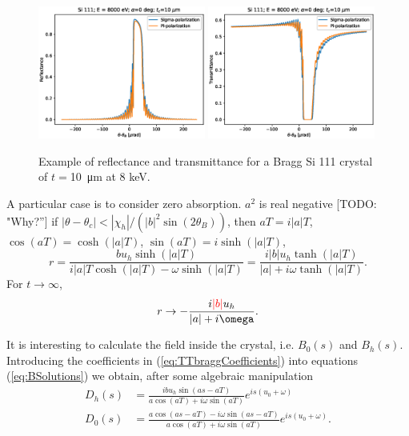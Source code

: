 \documentclass[preprint]{iucr}              %
\newcommand{\todo}[1]{{\color{red}[TODO: "#1'']}}
\newcommand{\inblue}[1]{{\color{blue}#1}}
\newcommand{\inred}[1]{{\color{red}#1}}
\begin{document}
\begin{figure}\label{fig:braggProfiles}
    \centering
    \includegraphics[width=0.49\textwidth]{figures/Bragg_1.eps}
    \includegraphics[width=0.49\textwidth]{figures/Bragg_2.eps}
    \caption{Example of reflectance and transmittance for a Bragg Si 111 crystal of $t=$\SI{10}{\micro\meter} at 8 keV. }
\end{figure}


\inblue{A particular case is to consider zero absorption. 
$a^2$ is real negative \todo{Why?} if $|\theta-\theta_c|<|\chi_h|/(|b|^2 \sin(2 \theta_B))$, then $aT=i |a| T$, $\cos(a T)=\cosh(|a|T)$, $\sin(a T)=i \sinh(|a|T)$, 
\begin{equation}
    r = \frac{b u_h \sinh(|a|T)}{i |a|T \cosh(|a|T)- \omega
    \sinh(|a|T)}=
\frac{i |b| u_h \tanh(|a|T)}{|a|+ i \omega \tanh(|a|T)}.
\end{equation}
For $t \rightarrow \infty$, 
\begin{equation}
    r \rightarrow - \frac{i \inred{|b|} u_h}{|a|+ i \omega} .
\end{equation}
}

\inblue{
It is interesting to calculate the field inside the crystal, i.e. $B_0(s)$ and $B_h(s)$. Introducing the coefficients in (\ref{eq:TTbraggCoefficients}) into equations (\ref{eq:BSolutions}) we obtain, after some algebraic manipulation
\begin{subequations}\label{eq:bragginside}
\begin{align}
D_h(s)&=\frac{i b u_h \sin(as - aT)}{a \cos(aT) + i \omega \sin(aT)} e^{is(u_0+\omega)}\\
D_0(s)&= \frac{a \cos(as-aT) - i \omega \sin(as-aT)}{a \cos(aT) + i \omega \sin(aT)} e^{is(u_0+\omega)}.
\end{align}
\end{subequations}
}
\end{document}
